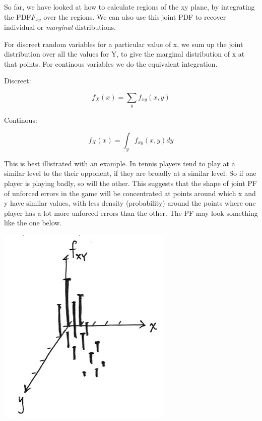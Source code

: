 \documentclass[]{book}
\theoremstyle{definition}
\theoremstyle{definition}
\theoremstyle{definition}
\theoremstyle{remark}
\begin{document}
So far, we have looked at how to calculate regions of the xy plane, by
integrating the PDF\(F_{xy}\) over the regions. We can also use this
joint PDF to recover individual or \emph{marginal} distributions.

For discreet random variables for a particular value of x, we sum up the
joint distribution over all the values for Y, to give the marginal
distribution of x at that points. For continous variables we do the
equivalent integration.

Discreet:

\[ f_X(x) = \sum_y f_{xy}(x,y) \]

Continous:

\[f_X(x) = \int_{y} f_{xy}(x,y)dy\]

This is best illistrated with an example. In tennis players tend to play
at a similar level to the their opponent, if they are broadly at a
similar level. So if one player is playing badly, so will the other.
This suggests that the shape of joint PF of unforced errors in the game
will be concentrated at points around which x and y have similar values,
with less density (probability) around the points where one player has a
lot more unforced errors than the other. The PF may look something like
the one below.

\includegraphics[width=1\linewidth]{images/jointPFtennis}
\end{document}
